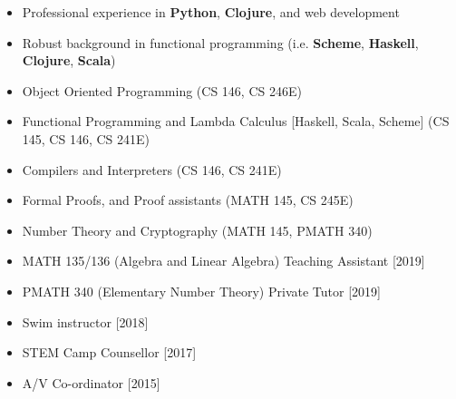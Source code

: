 
\begin{itemize}
    \item Professional experience in \textbf{Python}, \textbf{Clojure}, and web 
        development
    \item Robust background in functional programming (i.e. \textbf{Scheme}, 
        \textbf{Haskell}, \textbf{Clojure}, \textbf{Scala})
\end{itemize}

\smallskip

\begin{itemize}
    \item Object Oriented Programming (CS 146, CS 246E)
    \item Functional Programming and Lambda Calculus [Haskell, Scala, Scheme] 
        (CS 145, CS 146, CS 241E)
    \item Compilers and Interpreters (CS 146, CS 241E)
    \item Formal Proofs, and Proof assistants (MATH 145, CS 245E)
    \item Number Theory and Cryptography (MATH 145, PMATH 340)
\end{itemize}
\smallskip

\renewcommand{\labelitemi}{$\textperiodcentered$}
\begin{itemize}
    \item MATH 135/136 (Algebra and Linear Algebra) Teaching Assistant [2019]
    \item PMATH 340 (Elementary Number Theory) Private Tutor [2019]
    \item Swim instructor [2018]
    \item STEM Camp Counsellor [2017]
    \item A/V Co-ordinator [2015]
\end{itemize}

\smallskip



